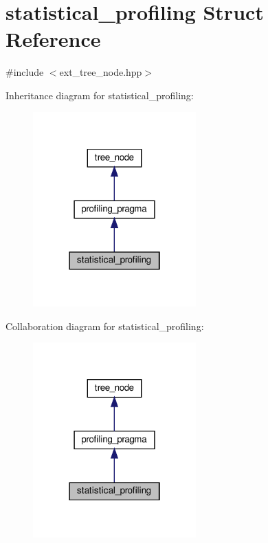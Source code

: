 \hypertarget{structstatistical__profiling}{}\section{statistical\+\_\+profiling Struct Reference}
\label{structstatistical__profiling}


{\ttfamily \#include $<$ext\+\_\+tree\+\_\+node.\+hpp$>$}



Inheritance diagram for statistical\+\_\+profiling\+:
\nopagebreak
\begin{figure}[H]
\begin{center}
\leavevmode
\includegraphics[width=178pt]{d8/d08/structstatistical__profiling__inherit__graph}
\end{center}
\end{figure}


Collaboration diagram for statistical\+\_\+profiling\+:
\nopagebreak
\begin{figure}[H]
\begin{center}
\leavevmode
\includegraphics[width=178pt]{d7/d96/structstatistical__profiling__coll__graph}
\end{center}
\end{figure}
